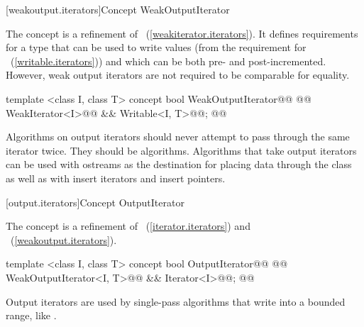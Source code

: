 
[weakoutput.iterators]{Concept WeakOutputIterator}


\begin{addedblock}
\pnum
The  concept is a refinement of
~(\ref{weakiterator.iterators}). It defines requirements for a type that
can be used to write values (from the requirement for
~(\ref{writable.iterators})) and which can be both pre- and post-incremented.
However, weak output iterators are not required to be comparable for equality.

%
\begin{codeblock}
  template <class I, class T>
  concept bool WeakOutputIterator@\newtxt{() \{}\oldtxt{ =}@
    @@ WeakIterator<I>@\newtxt{()}@ && Writable<I, T>@\newtxt{()}@;
  @\newtxt{\}}@
\end{codeblock}
\end{addedblock}

\pnum
\enternote
{}
\textit{}
Algorithms on output iterators should never attempt to pass through the same iterator twice.
They should be
algorithms.
Algorithms that take output iterators can be used with ostreams as the destination
for placing data through the
class as well as with insert iterators and insert pointers.
\exitnote

\begin{addedblock}
[output.iterators]{Concept OutputIterator}

\pnum
The  concept is a refinement of ~(\ref{iterator.iterators}) and
~(\ref{weakoutput.iterators}).

%
\begin{codeblock}
  template <class I, class T>
  concept bool OutputIterator@\newtxt{() \{}\oldtxt{ =}@
    @@ WeakOutputIterator<I, T>@\newtxt{()}@ && Iterator<I>@\newtxt{()}@;
  @\newtxt{\}}@
\end{codeblock}

\pnum
\enternote Output iterators are used by single-pass
algorithms that write into a bounded range, like .
\exitnote

\end{addedblock}

